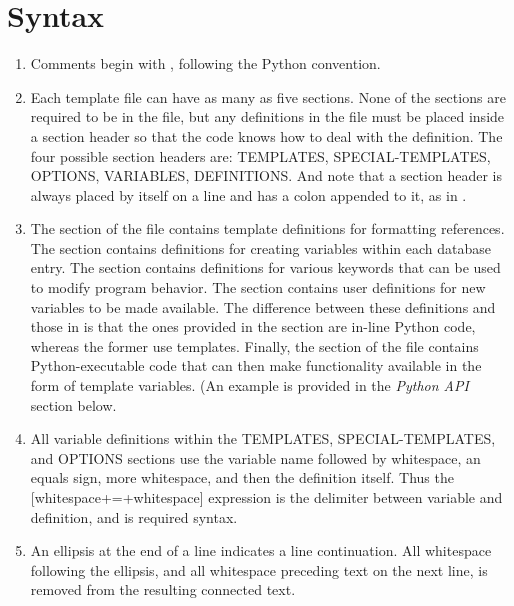 \documentclass[letterpaper,10pt,english]{sphinxmanual}
\begin{document}
\section{Syntax}
\label{guidelines_for_writing_style_templates:syntax}\begin{enumerate}
\item {} 
Comments begin with \code{\#}, following the Python convention.

\item {} 
Each template file can have as many as five sections. None of the sections are required to be in the file, but any definitions in the file must be placed inside a section header so that the code knows how to deal with the definition. The four possible section headers are: TEMPLATES, SPECIAL-TEMPLATES, OPTIONS, VARIABLES, DEFINITIONS. And note that a section header is always placed by itself on a line and has a colon appended to it, as in .

\item {} 
The  section of the file contains template definitions for formatting references. The  section contains definitions for creating variables within each database entry. The  section contains definitions for various keywords that can be used to modify program behavior. The  section contains user definitions for new variables to be made available. The difference between these definitions and those in  is that the ones provided in the  section are in-line Python code, whereas the former use templates. Finally, the  section of the file contains Python-executable code that can then make functionality available in the form of template variables. (An example is provided in the \emph{Python API} section below.

\item {} 
All variable definitions within the TEMPLATES, SPECIAL-TEMPLATES, and OPTIONS sections use the variable name followed by whitespace, an equals sign, more whitespace, and then the definition itself. Thus the {[}whitespace+=+whitespace{]} expression is the delimiter between variable and definition, and is required syntax.

\item {} 
An ellipsis  at the end of a line indicates a line continuation. All whitespace following the ellipsis, and all whitespace preceding text on the next line, is removed from the resulting connected text.


\end{enumerate}
\end{document}
